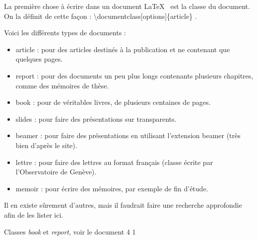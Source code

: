 \documentclass[a4paper, 12pt]{article}
\begin{document}
La première chose à écrire dans un document \LaTeX~ est la classe du document.
On la définit de cette façon : \textbackslash documentclass[options]\{article\} .

Voici les différents types de documents :
\begin{itemize}
\item article : pour des articles destinés à la publication et ne contenant que quelques pages.
\item report : pour des documents un peu plus longs contenants plusieurs chapitres, comme des mémoires de thèse.
\item book : pour de véritables livres, de plusieurs centaines de pages.
\item slides : pour faire des présentations sur transparents.

\item beamer : pour faire des présentations en utilisant l'extension beamer (très bien d'après le site).
\item lettre : pour faire des lettres au format français (classe écrite par l'Observatoire de Genève).
\item memoir : pour écrire des mémoires, par exemple de fin d'étude.
\end{itemize}

Il en existe s\^urement d'autres, mais il faudrait faire une recherche approfondie afin de les lister ici.

Classes {\em book} et {\em report}, voir le document 4 1
\end{document}

